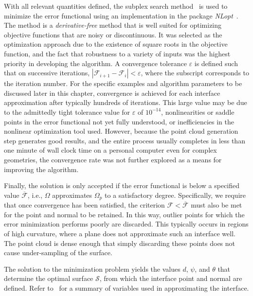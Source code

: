 With all relevant quantities defined, the subplex search method~\cite{rowan} is used to minimize the error functional using an implementation in the package \textit{NLopt}~\cite{nlo}. The method is a \textit{derivative-free} method that is well suited for optimizing objective functions that are noisy or discontinuous. It was selected as the optimization approach due to the existence of square roots in the objective function, and the fact that robustness to a variety of inputs was the highest priority in developing the algorithm. A convergence tolerance $\varepsilon$ is defined such that on successive iterations, $\left| \mathcal{F}_{i+1} - \mathcal{F}_{i}\right| < \varepsilon$, where the subscript corresponds to the iteration number. For the specific examples and algorithm parameters to be discussed later in this chapter, convergence is achieved for each interface approximation after typically hundreds of iterations. This large value may be due to the admittedly tight tolerance value for $\varepsilon$ of $10^{-14}$, nonlinearities or saddle points in the error functional not yet fully understood, or inefficiencies in the nonlinear optimization tool used. However, because the point cloud generation step generates good results, and the entire process usually completes in less than one minute of wall clock time on a personal computer even for complex geometries, the convergence rate was not further explored as a means for improving the algorithm.

Finally, the solution is only accepted if the error functional is below a specified value $\overline{\mathcal{F}}$, i.e., $\Omega$ approximates $\Omega_p$ to a satisfactory degree. Specifically, we require that once convergence has been satisfied, the criterion $\mathcal{F} < \overline{\mathcal{F}}$ must also be met for the point and normal to be retained. In this way, outlier points for which the error minimization performs poorly are discarded. This typically occurs in regions of high curvature, where a plane does not approximate such an interface well. The point cloud is dense enough that simply discarding these points does not cause under-sampling of the surface.

The solution to the minimization problem yields the values $d$, $\psi$, and $\theta$ that determine the optimal surface $\mathcal{S}$, from which the interface point and normal are defined. Refer to~ for a summary of variables used in approximating the interface.

